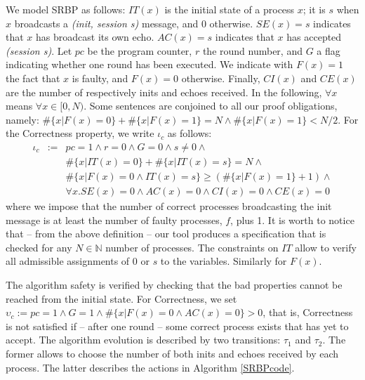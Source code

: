 \documentclass[11pt,a4paper]{article}
\begin{document}
{We model SRBP as follows: $IT(x)$ is the initial state of a process $x$; it is $s$ when $x$ broadcasts a \textit{(init, session s)} message, and 0 otherwise.  $SE(x)=s$ indicates that $x$ has broadcast its own echo. $AC(x)=s$ indicates that $x$ has accepted \textit{(session s)}.  Let $pc$ be the program counter, $r$ the round number, and $G$ a flag indicating whether one round has been executed.  We indicate with $F(x)=1$ the fact that $x$ is faulty, and $F(x)=0$ otherwise.  Finally, $CI(x)$ and $CE(x)$ are the number of respectively inits and echoes received.  
In the following, $\forall x$ means $\forall x \in [0, N)$.  
Some sentences are conjoined to all our proof obligations, namely:
$ \#\{x | F(x)=0\} + \#\{x | F(x) = 1\} = N \wedge \#\{x | F(x) = 1\} < N/2$.
For the Correctness property, we write $\iota_c$ as follows:
{\footnotesize
\begin{eqnarray}
\iota_c & := & pc=1 \wedge r=0 \wedge G=0 \wedge s \not =0 \wedge \\
& & \#\{x | IT(x)=0\} + \#\{x | IT(x) = s\} = N \wedge \\
& & \#\{x | F(x) = 0 \wedge IT(x)=s\} \geq (\#\{x | F(x) = 1\} +1) \wedge \\
& & \forall x. SE(x) = 0 \wedge AC(x) = 0 \wedge CI(x) = 0 \wedge CE(x) = 0
\end{eqnarray}
}
where we impose that the number of correct processes broadcasting the init message is at least the number of faulty processes, $f$, plus 1.  It is worth to notice that -- from the above definition -- our tool produces a specification that is checked for any $N \in \mathbb{N}$ number of processes.  The constraints on $IT$ allow to verify all admissible assignments of 0 or $s$ to the variables.  Similarly for $F(x)$.

The algorithm safety is verified by checking that
the bad properties 
cannot be reached from the initial state.  For Correctness, we set
$\upsilon_c := pc=1 \wedge G=1 \wedge \#\{x | F(x) =0 \wedge AC(x)=0\} >0$,
that is, Correctness is not satisfied if -- after one round -- some correct process exists that has yet to accept.
The algorithm evolution is described by two transitions: $\tau_1$ and $\tau_2$.  The former allows to choose the number of both inits and echoes received by each process.  The latter describes the actions in Algorithm \ref{SRBPcode}.

}
\end{document}
